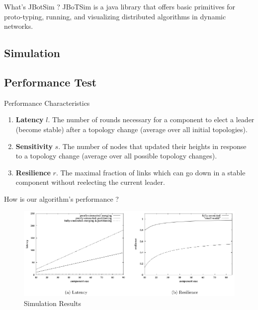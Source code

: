 \documentclass{beamer}
\begin{document}
\begin{frame}{What's JBotSim ?}
JBoTSim is a java library that offers basic primitives for proto-typing, running, and visualizing distributed algorithms in dynamic networks.
\end{frame}

\subsection{Simulation}
\begin{frame}





\end{frame}

\subsection{Performance Test}

\begin{frame}{Performance Characteristics}
	\begin{enumerate}
		\item \textbf{Latency} $l$. The number of rounds necessary for a component to elect a leader (become stable) after a topology change (average over all initial topologies).
		
		\item \textbf{Sensitivity} $s$. The number of nodes that updated their heights in response to a topology change (average over all possible topology changes).
		
		\item \textbf{Resilience} $r$. The maximal fraction of links which can go down in a stable component without reelecting the current leader.
		
	\end{enumerate}
\end{frame}
\begin{frame}{How is our algorithm's performance ?}
	\begin{figure}
		\centering
		\includegraphics[width=1.1\linewidth]{performance_test}
		\caption{Simulation Results}
		\label{fig:performancetest}
	\end{figure}
	
\end{frame}
\end{document}
